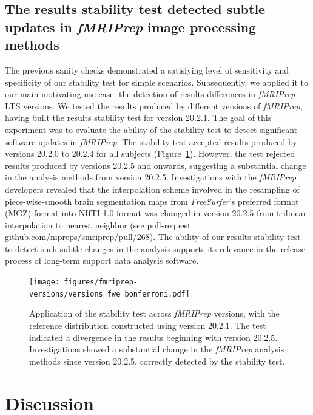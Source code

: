 \documentclass[lettersize,journal]{IEEEtran}
\newcommand{\fmriprep}{\emph{fMRIPrep}\xspace}
\begin{document}
\subsection{The results stability test detected subtle updates in \fmriprep image processing methods}

The previous sanity checks demonstrated a satisfying level of sensitivity and
specificity of our stability test for simple scenarios. Subsequently, we
applied it to our main motivating use case: the detection of results
differences in \fmriprep LTS versions. We tested the results produced by
different versions of \fmriprep, having built the results stability test for
version 20.2.1. The goal of this experiment was to evaluate the ability of the
stability test to detect significant software updates in \fmriprep. The
stability test accepted results produced by versions 20.2.0 to 20.2.4 for all
subjects (Figure~\ref{fig:version_bonferroni}). However, the test rejected
results produced by versions 20.2.5 and onwards, suggesting a substantial
change in the analysis methods from version 20.2.5. Investigations with the
\fmriprep developers revealed that the interpolation scheme involved in the
resampling of piece-wise-smooth brain segmentation maps from
\emph{FreeSurfer}'s preferred format (MGZ) format into NIfTI 1.0 format was
changed in version {20.2.5} from trilinear interpolation to nearest neighbor
(see pull-request
\href{https://github.com/nipreps/smriprep/pull/268}{\url{github.com/nipreps/smriprep/pull/268}}).
The ability of our results stability test to detect such subtle changes in the
analysis supports its relevance in the release process of long-term support
data analysis software.

\begin{figure}
  \centering
  \texttt{[image: figures/fmriprep-versions/versions\_fwe\_bonferroni.pdf]}
  \caption{Application of the stability test across \fmriprep versions, with the reference distribution constructed using version 20.2.1. The test indicated a divergence in the results beginning with version 20.2.5. Investigations showed a substantial change in the \fmriprep analysis methods since version 20.2.5, correctly detected by the stability test.}
  \label{fig:version_bonferroni}
\end{figure}

\section{Discussion}
\end{document}
